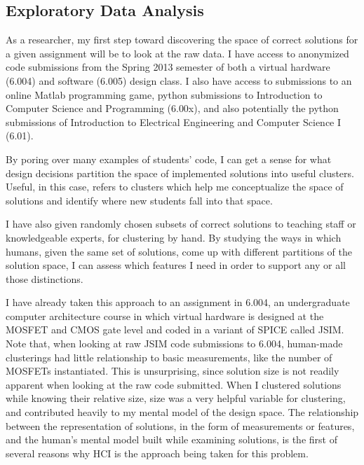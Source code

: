 \documentclass[12pt]{article}
\begin{document}

\subsection{Exploratory Data Analysis}

As a researcher, my first step toward discovering the space of correct solutions for a given assignment will be to look at the raw data. I have access to anonymized code submissions from the Spring 2013 semester of both a virtual hardware (6.004) and software (6.005) design class. I also have access to submissions to an online Matlab programming game, python submissions to Introduction to Computer Science and Programming (6.00x), and also potentially the python submissions of Introduction to Electrical Engineering and Computer Science I (6.01). 

By poring over many examples of students' code, I can get a sense for what design decisions partition the space of implemented solutions into useful clusters. Useful, in this case, refers to clusters which help me conceptualize the space of solutions and identify where new students fall into that space. 

I have also given randomly chosen subsets of correct solutions to teaching staff or knowledgeable experts, for clustering by hand. By studying the ways in which humans, given the same set of solutions, come up with different partitions of the solution space, I can assess which features I need in order to support any or all those distinctions. 

I have already taken this approach to an assignment in 6.004, an undergraduate computer architecture course in which virtual hardware is designed at the MOSFET and CMOS gate level and coded in a variant of SPICE called JSIM. Note that, when looking at raw JSIM code submissions to 6.004, human-made clusterings had little relationship to basic measurements, like the number of MOSFETs instantiated. This is unsurprising, since solution size is not readily apparent when looking at the raw code submitted. When I clustered solutions while knowing their relative size, size was a very helpful variable for clustering, and contributed heavily to my mental model of the design space. The relationship between the representation of solutions, in the form of measurements or features, and the human's mental model built while examining solutions, is the first of several reasons why HCI is the approach being taken for this problem.
\end{document}
